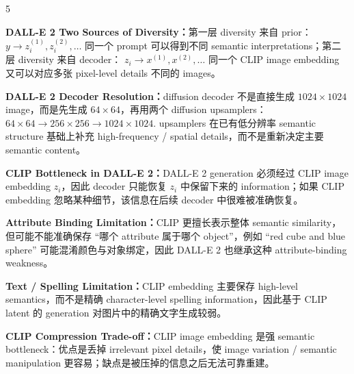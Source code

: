\documentclass[a4paper, landscape]{article}
\begin{document}
\begin{multicols}{5}
\par \textbf{DALL-E 2 Two Sources of Diversity：}第一层 diversity 来自 prior：
\(
y\rightarrow z_i^{(1)},z_i^{(2)},\ldots
\)
同一个 prompt 可以得到不同 semantic interpretations；第二层 diversity 来自 decoder：
\(
z_i\rightarrow x^{(1)},x^{(2)},\ldots
\)
同一个 CLIP image embedding 又可以对应多张 pixel-level details 不同的 images。

\par \textbf{DALL-E 2 Decoder Resolution：}diffusion decoder 不是直接生成 \(1024\times1024\) image，而是先生成 \(64\times64\)，再用两个 diffusion upsamplers：
\(
64\times64
\rightarrow
256\times256
\rightarrow
1024\times1024.
\)
upsamplers 在已有低分辨率 semantic structure 基础上补充 high-frequency / spatial details，而不是重新决定主要 semantic content。

\par \textbf{CLIP Bottleneck in DALL-E 2：}DALL-E 2 generation 必须经过 CLIP image embedding \(z_i\)，因此 decoder 只能恢复 \(z_i\) 中保留下来的 information；如果 CLIP embedding 忽略某种细节，该信息在后续 decoder 中很难被准确恢复。

\par \textbf{Attribute Binding Limitation：}CLIP 更擅长表示整体 semantic similarity，但可能不能准确保存 ``哪个 attribute 属于哪个 object''，例如 ``red cube and blue sphere'' 可能混淆颜色与对象绑定，因此 DALL-E 2 也继承这种 attribute-binding weakness。

\par \textbf{Text / Spelling Limitation：}CLIP embedding 主要保存 high-level semantics，而不是精确 character-level spelling information，因此基于 CLIP latent 的 generation 对图片中的精确文字生成较弱。

\par \textbf{CLIP Compression Trade-off：}CLIP image embedding 是强 semantic bottleneck：优点是丢掉 irrelevant pixel details，使 image variation / semantic manipulation 更容易；缺点是被压掉的信息之后无法可靠重建。


\end{multicols}
\end{document}
